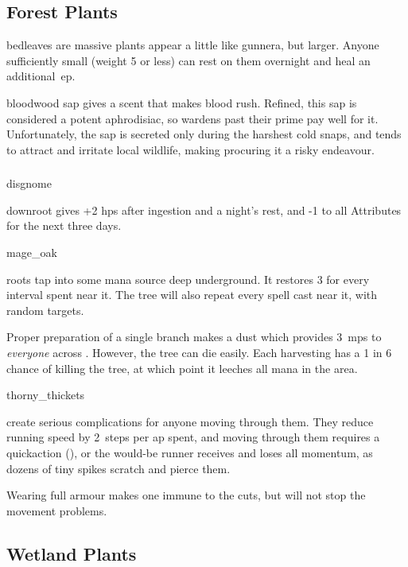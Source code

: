 \begin{multicols}{2}
\subsection{Forest Plants}
\label{plants}

%
  {bedleaves}%
  {are massive plants appear a little like gunnera, but larger.
  Anyone sufficiently small (\gls{weight} 5 or less) can rest on them overnight and heal an additional~\gls{ep}.}%

%
  {bloodwood}%
  {sap gives a scent that makes blood rush.
  Refined, this sap is considered a potent aphrodisiac, so \glspl{warden} past their prime pay well for it.
  Unfortunately, the sap is secreted only during the harshest cold snaps, 
  and tends to attract and irritate local wildlife, making procuring it a risky endeavour.
  }

\subsubsection{}
\glsdesc{disgnome}

%
  {downroot}%
  {gives +2 \glspl{hp} after ingestion and a night's rest, and -1 to all Attributes for the next three days.
  }

%
  {mage_oak}%
  {roots tap into some mana source deep underground.
    It restores 3  for every \gls{interval} spent near it.
    The tree will also repeat every spell cast near it, with random targets.

    Proper preparation of a single branch makes a dust which provides 3~\glspl{mp} to \emph{everyone} across .
    However, the tree can die easily.
    Each harvesting has a 1 in 6 chance of killing the tree, at which point it leeches all mana in the \gls{area}.
  }%

%
  {thorny_thickets}%
  {create serious complications for anyone moving through them.
    They reduce running speed by 2~\glspl{step} per \gls{ap} spent, and moving through them requires a  \gls{quickaction} (\tn[10]), or the would-be runner receives  and loses all momentum, as dozens of tiny spikes scratch and pierce them.

    Wearing full armour makes one immune to the cuts, but will not stop the movement problems.}%

\subsection{Wetland Plants}


\end{multicols}
